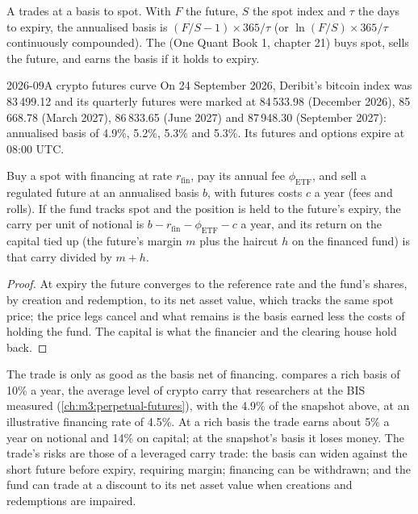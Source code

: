 A  trades at a basis to spot. With $F$ the future, $S$ the spot index and $\tau$ the days to expiry, the
annualised basis is $(F/S - 1)\times 365/\tau$ (or $\ln(F/S)\times 365/\tau$ continuously compounded). The  (One Quant Book 1, chapter 21) buys spot, sells the future, and earns the basis if it holds to expiry.

\begin{dated}{2026-09}{A crypto futures curve}\label{dat:m3:dated-futures-options-and-etfs:curve}
On 24 September 2026, Deribit's bitcoin index was 83\,499.12 and its quarterly futures were marked at 84\,533.98
(December 2026), 85\,668.78 (March 2027), 86\,833.65 (June 2027) and 87\,948.30 (September 2027): annualised basis of
4.9\%, 5.2\%, 5.3\% and 5.3\%. Its futures and options expire at 08:00 UTC.
\end{dated}

\begin{proposition}\label{prop:m3:dated-futures-options-and-etfs:carry}
Buy a spot  with financing at rate $r_{\mathrm{fin}}$, pay its annual fee $\phi_{\mathrm{ETF}}$,
and sell a regulated future at an annualised basis $b$, with futures costs $c$ a year (fees and rolls). If the fund
tracks spot and the position is held to the future's expiry, the carry per unit of notional is
$b - r_{\mathrm{fin}} - \phi_{\mathrm{ETF}} - c$ a year, and its return on the capital tied up (the future's margin $m$ plus
the haircut $h$ on the financed fund) is that carry divided by $m + h$.
\end{proposition}

\begin{proof}
At expiry the future converges to the reference rate and the fund's shares, by creation and redemption, to its net asset
value, which tracks the same spot price; the price legs cancel and what remains is the basis earned less the costs of
holding the fund. The capital is what the financier and the clearing house hold back.
\end{proof}

The trade is only as good as the basis net of financing.  compares a
rich basis of 10\% a year, the average level of crypto carry that researchers at the BIS measured
(\cref{ch:m3:perpetual-futures}), with the 4.9\% of the snapshot above, at an illustrative financing rate of 4.5\%. At a
rich basis the trade earns about 5\% a year on notional and 14\% on capital; at the snapshot's basis it loses money. The
trade's risks are those of a leveraged carry trade: the basis can widen against the short future before expiry, requiring
margin; financing can be withdrawn; and the fund can trade at a discount to its net asset value when creations and
redemptions are impaired.

